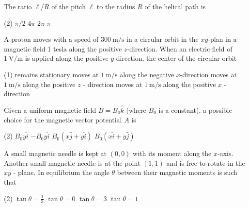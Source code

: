 \begin{enumerate}
\begin{minipage}{\textwidth}
	The ratio $\ell / R$ of the pitch $\ell$ to the radius $R$ of the helical path is
\end{minipage}
\begin{tasks}(2)
	\task[\textbf{A.}] $\pi / 2$
	\task[\textbf{B.}]$4 \pi$
	\task[\textbf{C.}]$2 \pi$
	\task[\textbf{D.}]$\pi$
\end{tasks}
\begin{minipage}{\textwidth}
	\item A proton moves with a speed of $300 \mathrm{~m} / \mathrm{s}$ in a circular orbit in the $x y$-plan in a magnetic field 1 tesla along the positive $z$-direction. When an electric field of $1 \mathrm{~V} / \mathrm{m}$ is applied along the positive $y$-direction, the center of the circular orbit
\end{minipage}
\begin{tasks}(1)
	\task[\textbf{A.}] remains stationary
	\task[\textbf{B.}]moves at $1 \mathrm{~m} / \mathrm{s}$ along the negative $x$-direction
	\task[\textbf{C.}]moves at $1 \mathrm{~m} / \mathrm{s}$ along the positive $z$ - direction
	\task[\textbf{D.}] moves at $1 \mathrm{~m} / \mathrm{s}$ along the positive $x$ - direction
\end{tasks}
\begin{minipage}{\textwidth}
	\item Given a uniform magnetic field $B=B_{0} \hat{k}$ (where $B_{0}$ is a constant), a possible choice for the magnetic vector potential $A$ is
\end{minipage}
\begin{tasks}(2)
	\task[\textbf{A.}] $B_{0} y \hat{i}$
	\task[\textbf{B.}] $-B_{0} y \hat{i}$
	\task[\textbf{C.}] $B_{0}(x \hat{j}+y \hat{i})$
	\task[\textbf{D.}]$B_{0}(x \hat{i}+y \hat{j})$
\end{tasks}
\begin{minipage}{\textwidth}
	\item A small magnetic needle is kept at $(0,0)$ with its moment along the $x$-axis. Another small magnetic needle is at the point $(1,1)$ and is free to rotate in the $x y$ - plane. In equilibrium the angle $\theta$ between their magnetic moments is such that
\end{minipage}
\begin{tasks}(2)
	\task[\textbf{A.}] $\tan \theta=\frac{1}{3}$
	\task[\textbf{B.}]$\tan \theta=0$
	\task[\textbf{C.}]$\tan \theta=3$
	\task[\textbf{D.}]$\tan \theta=1$
\end{tasks}

\end{enumerate}
